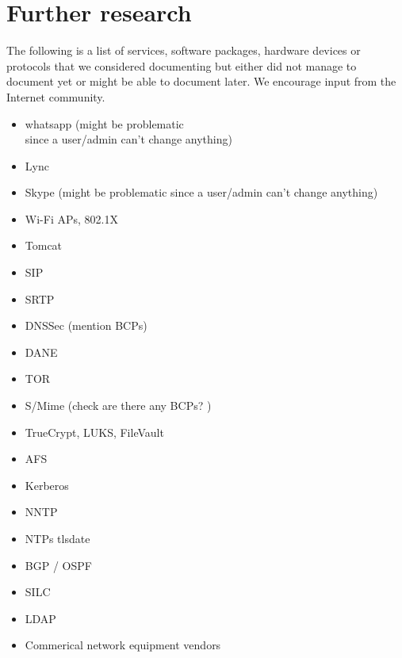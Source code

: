\newpage
\section{Further research}
\label{section:furtherresearch}
The following is a list of services, software packages, hardware devices or protocols that we considered documenting but either did not manage to document yet or might be able to document later. We encourage input from the Internet community. 

\vline{}

\begin{minipage}[b]{0.5\linewidth}
\begin{itemize}
\item whatsapp (might be problematic\\ since a user/admin can't change anything)
\item Lync
\item Skype (might be problematic since a user/admin can't change anything)
\item Wi-Fi APs, 802.1X
\item Tomcat
\item SIP 
\item SRTP 
\item DNSSec (mention BCPs) 
\item DANE
\item TOR 
\item S/Mime (check are there any BCPs? )
\item TrueCrypt, LUKS, FileVault
\item AFS 
\item Kerberos 
\item NNTP 
\item NTPs tlsdate 
\item BGP / OSPF 
\item SILC
\item LDAP
\item Commerical network equipment vendors
\end{itemize}
\end{minipage}
